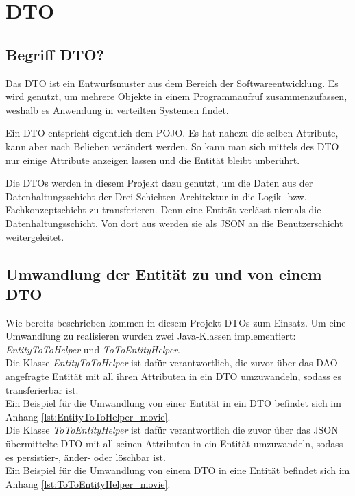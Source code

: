 \section{\acf{DTO}}
\label{sec:dto}
\authorsection{\authorSG}

\subsection{Begriff \acf{DTO}?}
\label{ssec:Was_ist_dto}

Das \ac{DTO} ist ein Entwurfsmuster aus dem Bereich der Softwareentwicklung.
Es wird genutzt, um mehrere Objekte in einem Programmaufruf zusammenzufassen, weshalb es Anwendung in verteilten Systemen findet.

Ein \ac{DTO} entspricht eigentlich dem \ac{POJO}.
Es hat nahezu die selben Attribute, kann aber nach Belieben verändert werden.
So kann man sich mittels des \ac{DTO} nur einige Attribute anzeigen lassen und die Entität bleibt unberührt.

Die \acsp{DTO} werden in diesem Projekt dazu genutzt, um die Daten aus der Datenhaltungsschicht der Drei-Schichten-Architektur in die Logik- bzw. Fachkonzeptschicht zu transferieren. Denn eine Entität verlässt niemals die Datenhaltungsschicht.
Von dort aus werden sie als \acs{JSON} an die Benutzerschicht weitergeleitet.

\subsection{Umwandlung der Entität zu und von einem \acf{DTO}}
\label{ssec:umwandlung_dto}

Wie bereits beschrieben kommen in diesem Projekt \acp{DTO} zum Einsatz. Um eine Umwandlung zu realisieren wurden zwei Java-Klassen implementiert: \textit{EntityToToHelper} und \textit{ToToEntityHelper}. \\

Die Klasse \textit{EntityToToHelper} ist dafür verantwortlich, die zuvor über das \acs{DAO} angefragte Entität mit all ihren Attributen in ein \acs{DTO} umzuwandeln, sodass es transferierbar ist. \\
Ein Beispiel für die Umwandlung von einer Entität in ein \acs{DTO} befindet sich im Anhang \vref{lst:EntityToToHelper_movie}. \\

Die Klasse \textit{ToToEntityHelper} ist dafür verantwortlich die zuvor über das \acs{JSON} übermittelte \acs{DTO} mit all seinen Attributen in ein Entität umzuwandeln, sodass es persistier-, änder- oder löschbar ist.\\ 
Ein Beispiel für die Umwandlung von einem \acs{DTO} in eine Entität befindet sich im Anhang \vref{lst:ToToEntityHelper_movie}.
